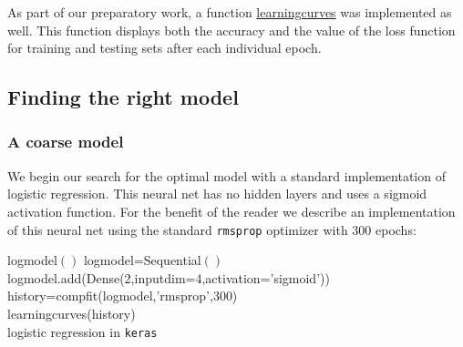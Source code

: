 \documentclass[14pt]{article}
\theoremstyle{plain}
\theoremstyle{definition}
\newcommand{\un}{\textunderscore}
\begin{document}
\noindent As part of our preparatory work, a function \underline{learning\un curves} was implemented as well. This function displays both the accuracy and the value of the loss function for training and testing sets after each individual epoch.

\subsection{Finding the right model}

\subsubsection{A coarse model}\label{coarse}
We begin our search for the optimal model with a standard implementation of logistic regression. This neural net has no hidden layers and uses a sigmoid activation function. For the benefit of the reader we describe an implementation of this neural net using the standard \texttt{rmsprop} optimizer with 300 epochs:
\begin{algorithm}
	log\un model$()$\;
    log\un model=Sequential$()$\\
	log\un model.add(Dense(2,input\un dim=4,activation='sigmoid'))\\
	history=comp\un fit(logmodel,'rmsprop',300)\\
	learning\un curves(history)\\
   \caption{logistic regression in \texttt{keras} }
\end{algorithm}
\end{document}
